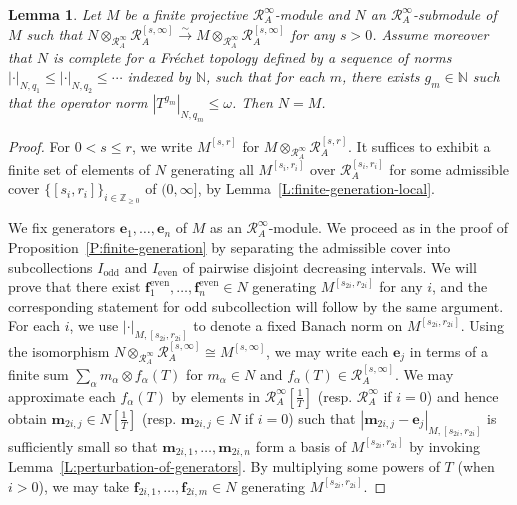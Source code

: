 \documentclass[12pt]{article}
\newtheorem{lemma}[theorem]{Lemma}
\theoremstyle{definition}
\numberwithin{equation}{theorem}
\newcommand{\calR}{\mathcal{R}}
\newcommand{\NN}{\mathbb{N}}
\newcommand{\ZZ}{\mathbb{Z}}
\newcommand{\bbe}{\mathbf{e}}
\newcommand{\bbf}{\mathbf{f}}
\newcommand{\bbm}{\mathbf{m}}
\newcommand{\even}{\mathrm{even}}
\newcommand{\odd}{\mathrm{odd}}
\begin{document}
\begin{lemma}
\label{L:variant finite generation}
Let $M$ be a finite projective $\calR_A^\infty$-module and $N$ an $\calR_A^\infty$-submodule of $M$ such that $N \otimes_{\calR_A^\infty} \calR_A^{[s,\infty]} \stackrel \sim \to M\otimes_{\calR_A^\infty} \calR_A^{[s,\infty]}$ for any $ s>0$.
Assume moreover that $N$ is complete for a Fr\'echet topology defined by a sequence of norms $|\cdot|_{N, q_1}\leq |\cdot|_{N, q_2} \leq \cdots$ indexed by $\NN$, such that for each $m$, there exists $g_m \in \NN$ such that the operator norm $|T^{g_m}|_{N,q_m} \leq \omega$.  Then $N=M$.
\end{lemma}
\begin{proof}
For $0<s\leq r$, we write $M^{[s,r]}$ for $M  \otimes_{\calR_A^\infty} \calR_A^{[s,r]}$.
It suffices to exhibit a finite set of elements of $N$ generating all $M^{[s_i,r_i]}$ over $\calR_A^{[s_i,r_i]}$ for some admissible cover $\{[s_i,r_i]\}_{i\in \ZZ_{\geq0}}$ of $(0,\infty]$, by Lemma~\ref{L:finite-generation-local}.

We fix generators $\bbe_1, \dots, \bbe_n$ of $M$ as an $\calR_A^\infty$-module.
We proceed as in the proof of Proposition~\ref{P:finite-generation} by separating the admissible cover into subcollections $I_\odd$ and $I_\even$ of pairwise disjoint decreasing intervals.  We will prove that there exist $\bbf_1^\even, \dots, \bbf_n^\even \in N$ generating $M^{[s_{2i}, r_{2i}]}$ for any $i$, and the corresponding statement for odd subcollection will follow by the same argument.  For each $i$, we use $|\cdot|_{M, [s_{2i}, r_{2i}]}$ to denote a fixed Banach norm on $M^{[s_{2i}, r_{2i}]}$.  
Using the isomorphism $N \otimes_{\calR_A^\infty} \calR_A^{[s,\infty]} \cong M^{[s,\infty]}$, we may write each $\bbe_j$ in terms of a finite sum $\sum_\alpha m_\alpha \otimes f_\alpha(T)$ for $m_\alpha \in N$ and $f_\alpha(T) \in \calR_A^{[s,\infty]}$.  We may approximate each $f_\alpha(T)$ by elements in $\calR_A^\infty[\frac 1T]$ (resp. $\calR_A^\infty$ if $i=0$) and hence obtain $\bbm_{2i,j} \in N[\frac1T]$ (resp. $\bbm_{2i,j} \in N$ if $i=0$) such that $|\bbm_{2i,j} - \bbe_j|_{M, [s_{2i},r_{2i}]}$ is sufficiently small so that $\bbm_{2i,1}, \dots, \bbm_{2i,n}$ form a basis of $M^{[s_{2i}, r_{2i}]}$ by invoking Lemma~\ref{L:perturbation-of-generators}.  By multiplying some powers of $T$ (when $i>0$), we may take $\bbf_{2i,1}, \dots, \bbf_{2i,m} \in N$ generating $M^{[s_{2i}, r_{2i}]}$. 


\end{proof}
\end{document}
